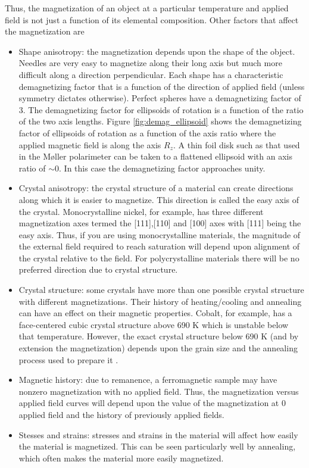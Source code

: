 \documentclass[12pt]{article}
\begin{document}
 Thus, the magnetization of an object at a particular temperature and applied field is not just a function of its elemental composition. Other factors that affect the magnetization are
\begin{itemize}
\item{Shape anisotropy: the magnetization depends upon the shape of the object. Needles are very easy to magnetize along their long axis but much more difficult along a direction perpendicular. Each shape has a characteristic demagnetizing factor that is a function of the direction of applied field (unless symmetry dictates otherwise). Perfect spheres have a demagnetizing factor of 3. The demagnetizing factor for ellipsoids of rotation is a function of the ratio of the two axis lengths. Figure \ref{fig:demag_ellipsoid} shows the demagnetizing factor of ellipsoids of rotation as a function of the axis ratio where the applied magnetic field is along the axis $R_z$. A thin foil disk such as that used in the M\o ller polarimeter can be taken to a flattened ellipsoid with an axis ratio of $\sim$0. In this case the demagnetizing factor approaches unity.}
\item{Crystal anisotropy: the crystal structure of a material can create directions along which it is easier to magnetize. This direction is called the easy axis of the crystal. Monocrystalline nickel, for example, has three different magnetization axes termed the [111],[110] and [100] axes with [111] being the easy axis. Thus, if you are using monocrystalline materials, the magnitude of the external field required to reach saturation will depend upon alignment of the crystal relative to the field. For polycrystalline materials there will be no preferred direction due to crystal structure.}
\item{Crystal structure: some crystals have more than one possible crystal structure with different magnetizations. Their history of heating/cooling and annealing can have an effect on their magnetic properties. Cobalt, for example, has a face-centered cubic crystal structure above 690 K which is unstable below that temperature. However, the exact crystal structure below 690 K (and by extension the magnetization) depends upon the grain size and the annealing process used to prepare it \cite{Owen1954}.}
\item{Magnetic history: due to remanence, a ferromagnetic sample may have nonzero magnetization with no applied field. Thus, the magnetization versus applied field curves will depend upon the value of the magnetization at 0 applied field and the history of previously applied fields.}
\item{Stesses and strains: stresses and strains in the material will affect how easily the material is magnetized. This can be seen particularly well by annealing, which often makes the material more easily magnetized\cite{Case1966}.}
\end{itemize}
 
\end{document}
